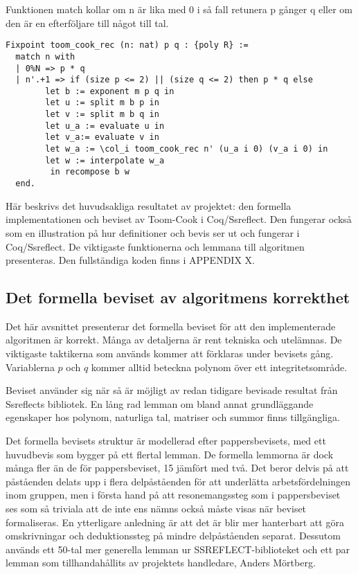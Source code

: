 Funktionen match kollar om n är lika med 0 i så fall retunera p gånger q eller
om den är en efterföljare till något till tal.

\begin{verbatim}
Fixpoint toom_cook_rec (n: nat) p q : {poly R} :=
  match n with
  | 0%N => p * q
  | n'.+1 => if (size p <= 2) || (size q <= 2) then p * q else
        let b := exponent m p q in
        let u := split m b p in
        let v := split m b q in
        let u_a := evaluate u in
        let v_a:= evaluate v in
        let w_a := \col_i toom_cook_rec n' (u_a i 0) (v_a i 0) in
        let w := interpolate w_a
         in recompose b w
  end.
\end{verbatim}
Här beskrivs det huvudsakliga resultatet av projektet: den formella
implementationen och beviset av Toom-Cook i Coq/Ssreflect. Den fungerar också
som en illustration på hur definitioner och bevis ser ut och fungerar i
Coq/Ssreflect. De viktigaste funktionerna och lemmana till algoritmen
presenteras. Den fullständiga koden finns i APPENDIX X.

\subsection{Det formella beviset av algoritmens korrekthet}
Det här avsnittet presenterar det formella beviset för att den implementerade
algoritmen är korrekt. Många av detaljerna är rent tekniska och utelämnas. De
viktigaste taktikerna som används kommer att förklaras under bevisets gång.
Variablerna $p$ och $q$ kommer alltid beteckna polynom över ett
integritetsområde.

Beviset använder sig när så är möjligt av redan tidigare bevisade resultat från
Ssreflects bibliotek. En lång rad lemman om bland annat grundläggande
egenskaper hos polynom, naturliga tal, matriser och summor finns tillgängliga.

Det formella bevisets struktur är modellerad efter pappersbevisets, med ett
huvudbevis som bygger på ett flertal lemman. De formella lemmorna är dock många
fler än de för pappersbeviset, 15 jämfört med två. Det beror delvis på att
påståenden delats upp i flera delpåståenden för att underlätta
arbetsfördelningen inom gruppen, men i första hand på att resonemangssteg som i
pappersbeviset ses som så triviala att de inte ens nämns också måste visas när
beviset formaliseras. En ytterligare anledning är att det är blir mer
hanterbart att göra omskrivningar och deduktionssteg på mindre delpåståenden
separat. Dessutom används ett 50-tal mer generella lemman ur
SSREFLECT-biblioteket och ett par lemman som tillhandahållits av projektets
handledare, Anders Mörtberg.

